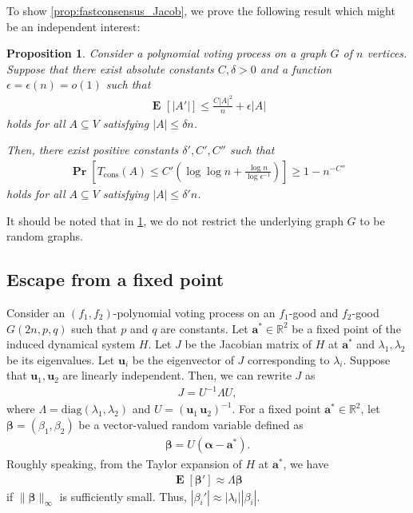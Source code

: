 \documentclass[letterpaper,11pt]{article}
\newtheorem{proposition}[theorem]{Proposition}
\newcommand{\Tcons}{T_{\mathrm{cons}}}
\renewcommand\Pr{\mathop{\mathbf{Pr}}}
\DeclareMathOperator{\E}{\mathbf{E}}
\begin{document}
To show \cref{prop:fastconsensus_Jacob}, we prove the following result which might be an independent interest:
\begin{proposition} \label{prop:fastconsensus}
Consider a polynomial voting process on a graph $G$ of $n$ vertices.
Suppose that there exist absolute constants $C,\delta>0$ and a function $\epsilon=\epsilon(n)=o(1)$ such that
\begin{align*}
\E_{}[|A'|]\leq \frac{C|A|^{2}}{n}+\epsilon|A|
\end{align*}
holds for all $A\subseteq V$ satisfying $|A|\leq \delta n$.

Then, there exist positive constants $\delta',C',C''$ such that
\begin{align*}
\Pr\left[\Tcons(A)\leq C'\left(\log\log n+\frac{\log n}{\log\epsilon^{-1}}\right) \right]\geq 1-n^{-C''}
\end{align*}
holds for all $A\subseteq V$ satisfying $|A|\leq \delta'n$.
\end{proposition}

It should be noted that in \cref{prop:fastconsensus}, we do not restrict the underlying graph $G$ to be random graphs.






\subsection{Escape from a fixed point}
Consider an $(f_1,f_2)$-polynomial voting process on an $f_1$-good and $f_2$-good $G(2n,p,q)$ such that $p$ and $q$ are constants.
Let $\mathbf{a}^* \in \mathbb{R}^2$ be a fixed point of the induced dynamical system $H$.
Let $J$ be the Jacobian matrix of $H$ at $\mathbf{a}^*$ and $\lambda_1,\lambda_2$ be its eigenvalues.
Let $\mathbf{u}_i$ be the eigenvector of $J$ corresponding to $\lambda_i$.
Suppose that $\mathbf{u}_1,\mathbf{u}_2$ are linearly independent.
Then, we can rewrite $J$ as
\begin{align*}
J=U^{-1}\Lambda U,
\end{align*}
where $\Lambda=\mathrm{diag}(\lambda_1,\lambda_2)$ and $U=(\mathbf{u}_1\,\mathbf{u}_2)^{-1}$.
For a fixed point $\mathbf{a}^* \in \mathbb{R}^2$, let ${\boldsymbol \beta}=(\beta_1,\beta_2)$ be a vector-valued random variable defined as
\begin{align}
{\boldsymbol \beta}=U({\boldsymbol \alpha}-\mathbf{a}^*). \label{eqn:betadef}
\end{align}
Roughly speaking, from the Taylor expansion of $H$ at $\mathbf{a}^*$, we have
\begin{align*}
\E[{\boldsymbol \beta}']\approx \Lambda {\boldsymbol \beta}
\end{align*}
if $\|{\boldsymbol \beta}\|_\infty$ is sufficiently small.
Thus, $|\beta_i'|\approx |\lambda_i||\beta_i|$.
\end{document}

